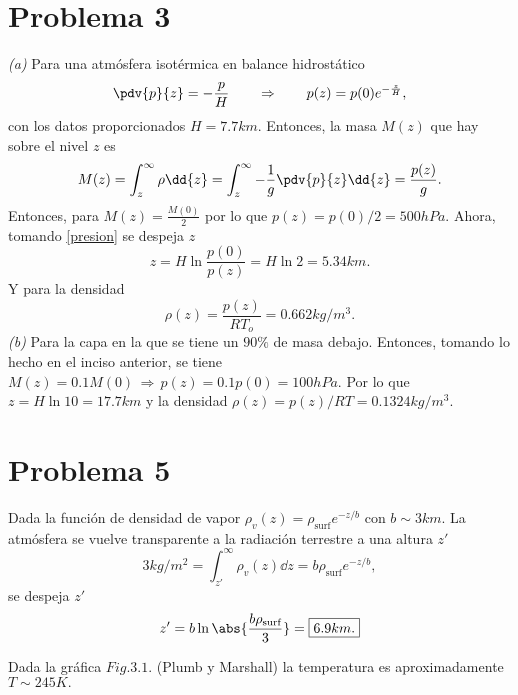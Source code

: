 \vspace{0.5cm}


\section*{Problema 3}
\textit{(a)} Para una atmósfera isotérmica en balance hidrostático
\begin{equation}
	\pdv{p}{z} = -\frac{p}{H} \qquad \Rightarrow \qquad p(z) = p(0) e^{-\frac{z}{H}}, \label{presion}
\end{equation}
con los datos proporcionados $H = 7.7km$. Entonces, la masa $M(z)$ que hay sobre el nivel $z$ es
	$$ M(z) = \int _z ^\infty \rho \dd{z} = \int _z ^\infty -\frac{1}{g} \pdv{p}{z} \dd{z} = \frac{p(z)}{g}. $$
Entonces, para $M(z) = \frac{M(0)}{2}$ por lo que $p(z) = p(0)/2 = \boxed{500hPa.}$ Ahora, tomando \eqref{presion} se despeja $z$
	$$ z = H\ln{\frac{p(0)}{p(z)}} = H\ln{2} = \boxed{5.34km.} $$
Y para la densidad
	$$ \rho (z) = \frac{p(z)}{RT_o} = \boxed{0.662kg/m^3 .} $$
\textit{(b)} Para la capa en la que se tiene un $90\%$ de masa debajo. Entonces, tomando lo hecho en el inciso anterior, se tiene $M(z) = 0.1M(0) \, \Rightarrow \, p(z) = 0.1p(0) = \boxed{100hPa}$. Por lo que $z = H \ln{10} = \boxed{17.7km}$ y la densidad $\rho (z) = p(z)/RT = \boxed{0.1324kg/m^3 .}$
	
\section*{Problema 5}
Dada la función de densidad de vapor $\rho _v (z) = \rho _{\text{surf}} e^{-z/b}$ con $b\sim 3km$. La atmósfera se vuelve transparente a la radiación terrestre a una altura $z'$
	$$ 3kg/m^2 = \int _{z'} ^\infty \rho _v (z) \dd{z} = b\rho _{\text{surf}} e^{-z/b}, $$
se despeja $z'$
	$$ z' = b\ln{\abs{\frac{b\rho _{\text{surf}}}{3}}} = \boxed{6.9km .} $$

Dada la gráfica $Fig. 3.1.$ (Plumb y Marshall) la temperatura es aproximadamente $\boxed{T\sim 245K .}$























